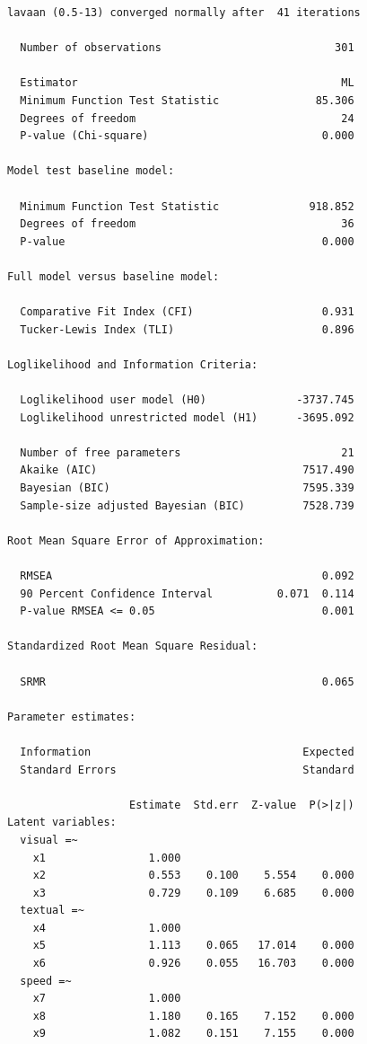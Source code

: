 \begin{verbatim}
lavaan (0.5-13) converged normally after  41 iterations

  Number of observations                           301

  Estimator                                         ML
  Minimum Function Test Statistic               85.306
  Degrees of freedom                                24
  P-value (Chi-square)                           0.000

Model test baseline model:

  Minimum Function Test Statistic              918.852
  Degrees of freedom                                36
  P-value                                        0.000

Full model versus baseline model:

  Comparative Fit Index (CFI)                    0.931
  Tucker-Lewis Index (TLI)                       0.896

Loglikelihood and Information Criteria:

  Loglikelihood user model (H0)              -3737.745
  Loglikelihood unrestricted model (H1)      -3695.092

  Number of free parameters                         21
  Akaike (AIC)                                7517.490
  Bayesian (BIC)                              7595.339
  Sample-size adjusted Bayesian (BIC)         7528.739

Root Mean Square Error of Approximation:

  RMSEA                                          0.092
  90 Percent Confidence Interval          0.071  0.114
  P-value RMSEA <= 0.05                          0.001

Standardized Root Mean Square Residual:

  SRMR                                           0.065

Parameter estimates:

  Information                                 Expected
  Standard Errors                             Standard

                   Estimate  Std.err  Z-value  P(>|z|)
Latent variables:
  visual =~
    x1                1.000
    x2                0.553    0.100    5.554    0.000
    x3                0.729    0.109    6.685    0.000
  textual =~
    x4                1.000
    x5                1.113    0.065   17.014    0.000
    x6                0.926    0.055   16.703    0.000
  speed =~
    x7                1.000
    x8                1.180    0.165    7.152    0.000
    x9                1.082    0.151    7.155    0.000


\end{verbatim}
